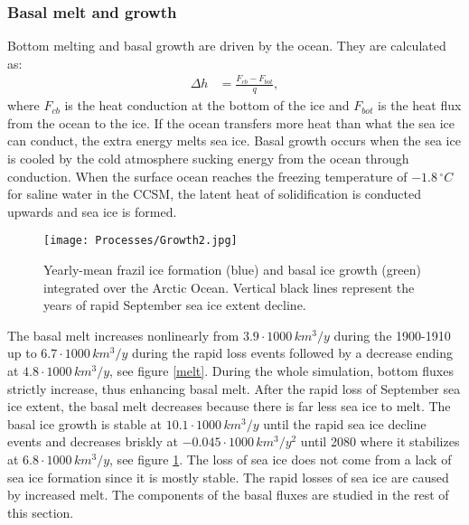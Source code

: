 \subsubsection{Basal melt and growth}\label{Bm&g}

Bottom melting and basal growth are driven by the ocean. They are calculated as:
\begin{align}
\Delta h &= \frac{F_{cb} - F_{bot}}{q},
\end{align}
where $F_{cb}$ is the heat conduction at the bottom of the ice and $F_{bot}$ is the heat flux from the ocean to the ice. If the ocean transfers more heat than what the sea ice can conduct, the extra energy melts sea ice. Basal growth occurs when the sea ice is cooled by the cold atmosphere sucking energy from the ocean through conduction. When the surface ocean reaches the freezing temperature of $-1.8\,^\circ C$ for saline water in the CCSM, the latent heat of solidification is conducted upwards and sea ice is formed. 
\begin{figure}[t!]
\center
\noindent\texttt{[image: Processes/Growth2.jpg]}
\caption{Yearly-mean frazil ice formation (blue) and basal ice growth (green) integrated over the Arctic Ocean. Vertical black lines represent the years of rapid September sea ice extent decline.}
\label{growth}
\end{figure}
The basal melt increases nonlinearly from $3.9 \cdot 1000 \, km^3/y$ during the 1900-1910 up to $6.7 \cdot 1000 \, km^3/y$ during the rapid loss events followed by a decrease ending at $4.8 \cdot 1000 \, km^3/y$, see figure \ref{melt}. During the whole simulation, bottom fluxes strictly increase, thus enhancing basal melt. After the rapid loss of September sea ice extent, the basal melt decreases because there is far less sea ice to melt. The basal ice growth is stable at $10.1 \cdot 1000 \, km^3/y$ until the rapid sea ice decline events and decreases briskly at $-0.045 \cdot 1000 \, km^3/y^2$ until 2080 where it stabilizes at $6.8 \cdot 1000 \, km^3/y$, see figure \ref{growth}. The loss of sea ice does not come from a lack of sea ice formation since it is mostly stable. The rapid losses of sea ice are caused by increased melt. The components of the basal fluxes are studied in the rest of this section. 

